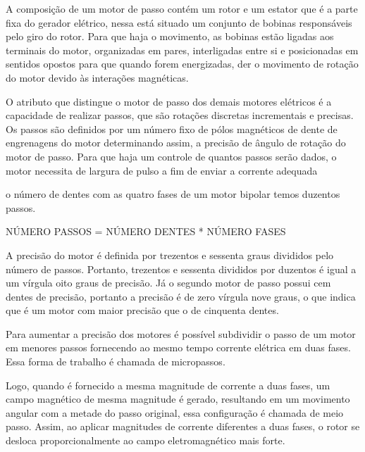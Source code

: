 A composição de um motor de passo contém um rotor e um estator que é a parte fixa do gerador elétrico, nessa está 
situado um conjunto de bobinas responsáveis pelo giro do rotor. Para que haja o movimento, as bobinas estão ligadas 
aos terminais do motor, organizadas em pares, interligadas entre si e posicionadas em sentidos opostos para que 
quando forem energizadas, der o movimento de rotação do motor devido às interações magnéticas.

O atributo que distingue o motor de passo dos demais motores elétricos é a capacidade de realizar passos, que são 
rotações discretas incrementais e precisas. Os passos são definidos por um número fixo de pólos magnéticos de dente 
de engrenagens do motor determinando assim, a precisão de ângulo de rotação do motor de passo. Para que haja um 
controle de quantos passos serão dados, o motor necessita de largura de pulso a fim de enviar a corrente adequada 

    
o número de dentes com as quatro fases de um motor bipolar temos duzentos passos.

NÚMERO PASSOS = NÚMERO DENTES * NÚMERO FASES

A precisão do motor é definida por trezentos e sessenta graus divididos pelo número de passos. Portanto, 
trezentos e sessenta divididos por duzentos é igual a um vírgula oito graus de precisão. Já o segundo motor 
de passo possui cem dentes de precisão, portanto a precisão é de zero vírgula nove graus, o que indica que 
é um motor com maior precisão que o de cinquenta dentes.

Para aumentar a precisão dos motores é possível subdividir o passo de um motor em menores passos fornecendo 
ao mesmo tempo corrente elétrica em duas fases. Essa forma de trabalho é chamada de micropassos.

Logo, quando é fornecido a mesma magnitude de corrente a duas fases, um campo magnético de mesma magnitude 
é gerado, resultando em um movimento angular com a metade do passo original, essa configuração é chamada de 
meio passo. Assim, ao aplicar magnitudes de corrente diferentes a duas fases, o rotor se desloca 
proporcionalmente ao campo eletromagnético mais forte.

